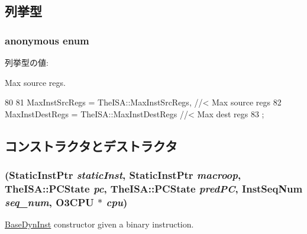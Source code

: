 \subsection{列挙型}
\hypertarget{classBaseO3DynInst_a4caf8d8f829279fba122163d961608a4}{
\subsubsection[{"@33}]{\setlength{\rightskip}{0pt plus 5cm}anonymous enum}}
\label{classBaseO3DynInst_a4caf8d8f829279fba122163d961608a4}
\begin{Desc}
\item[列挙型の値: ]\par
\begin{description}
\item[{\em 
\hypertarget{classBaseO3DynInst_a4caf8d8f829279fba122163d961608a4a17b78fe104e3bf28fca535a040514084}{
MaxInstSrcRegs}
\label{classBaseO3DynInst_a4caf8d8f829279fba122163d961608a4a17b78fe104e3bf28fca535a040514084}
}]\item[{\em 
\hypertarget{classBaseO3DynInst_a4caf8d8f829279fba122163d961608a4a6a2e9b17a83d01eb4ee6bbdd739be9eb}{
MaxInstDestRegs}
\label{classBaseO3DynInst_a4caf8d8f829279fba122163d961608a4a6a2e9b17a83d01eb4ee6bbdd739be9eb}
}]Max source regs. \end{description}
\end{Desc}




\begin{DoxyCode}
80          {
81         MaxInstSrcRegs = TheISA::MaxInstSrcRegs,        //< Max source regs
82         MaxInstDestRegs = TheISA::MaxInstDestRegs       //< Max dest regs
83     };
\end{DoxyCode}


\subsection{コンストラクタとデストラクタ}
\hypertarget{classBaseO3DynInst_ace637dac5d0a5a8fb37bac3c5bcb2839}{
\subsubsection[{BaseO3DynInst}]{ ({\bf StaticInstPtr} {\em staticInst}, \/  {\bf StaticInstPtr} {\em macroop}, \/  TheISA::PCState {\em pc}, \/  TheISA::PCState {\em predPC}, \/  {\bf InstSeqNum} {\em seq\_\-num}, \/  {\bf O3CPU} $\ast$ {\em cpu})}}
\label{classBaseO3DynInst_ace637dac5d0a5a8fb37bac3c5bcb2839}
\hyperlink{classBaseDynInst}{BaseDynInst} constructor given a binary instruction. 


